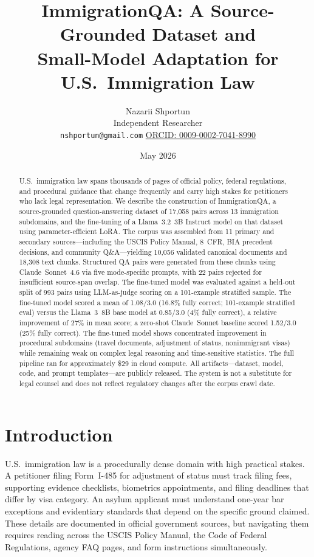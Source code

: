 \documentclass[11pt]{article}
\title{ImmigrationQA: A Source-Grounded Dataset and\\
Small-Model Adaptation for U.S.\ Immigration Law}
\author{Nazarii Shportun \\
Independent Researcher \\
\texttt{nshportun@gmail.com} \quad
\href{https://orcid.org/0009-0002-7041-8990}{ORCID: 0009-0002-7041-8990}}
\date{May 2026}
\begin{document}
\maketitle

\begin{abstract}
U.S.\ immigration law spans thousands of pages of official policy, federal regulations, and procedural guidance that change frequently and carry high stakes for petitioners who lack legal representation. We describe the construction of ImmigrationQA, a source-grounded question-answering dataset of 17,058 pairs across 13 immigration subdomains, and the fine-tuning of a Llama~3.2~3B Instruct model on that dataset using parameter-efficient LoRA. The corpus was assembled from 11 primary and secondary sources---including the USCIS Policy Manual, 8~CFR, BIA precedent decisions, and community Q\&A---yielding 10,056 validated canonical documents and 18,308 text chunks. Structured QA pairs were generated from these chunks using Claude~Sonnet~4.6 via five mode-specific prompts, with 22 pairs rejected for insufficient source-span overlap. The fine-tuned model was evaluated against a held-out split of 993 pairs using LLM-as-judge scoring on a 101-example stratified sample. The fine-tuned model scored a mean of 1.08/3.0 (16.8\% fully correct; 101-example stratified eval) versus the Llama~3~8B base model at 0.85/3.0 (4\% fully correct), a relative improvement of 27\% in mean score; a zero-shot Claude~Sonnet baseline scored 1.52/3.0 (25\% fully correct). The fine-tuned model shows concentrated improvement in procedural subdomains (travel documents, adjustment of status, nonimmigrant visas) while remaining weak on complex legal reasoning and time-sensitive statistics. The full pipeline ran for approximately \$29 in cloud compute. All artifacts---dataset, model, code, and prompt templates---are publicly released. The system is not a substitute for legal counsel and does not reflect regulatory changes after the corpus crawl date.
\end{abstract}

\section{Introduction}
\label{sec:intro}

U.S.\ immigration law is a procedurally dense domain with high practical stakes. A petitioner filing Form~I-485 for adjustment of status must track filing fees, supporting evidence checklists, biometrics appointments, and filing deadlines that differ by visa category. An asylum applicant must understand one-year bar exceptions and evidentiary standards that depend on the specific ground claimed. These details are documented in official government sources, but navigating them requires reading across the USCIS Policy Manual, the Code of Federal Regulations, agency FAQ pages, and form instructions simultaneously.
\end{document}
